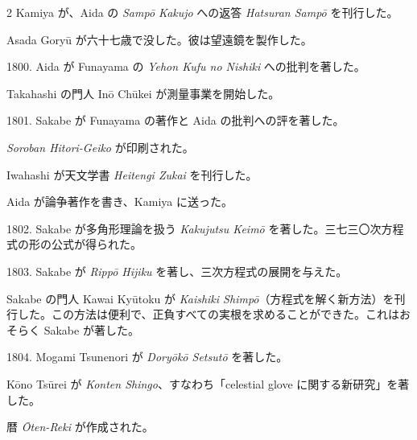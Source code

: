 \documentclass[11pt]{article}
\newcommand{\scanfooter}{}
\begin{document}
\begin{multicols}{2}
Kamiya が、Aida の \emph{Sampō Kakujo} への返答 \emph{Hatsuran Sampō} を刊行した。

Asada Goryū が六十七歳で没した。彼は望遠鏡を製作した。

1800. Aida が Funayama の \emph{Yehon Kufu no Nishiki} への批判を著した。

Takahashi の門人 Inō Chūkei が測量事業を開始した。

1801. Sakabe が Funayama の著作と Aida の批判への評を著した。

\emph{Soroban Hitori-Geiko} が印刷された。

Iwahashi が天文学書 \emph{Heitengi Zukai} を刊行した。

Aida が論争著作を書き、Kamiya に送った。

1802. Sakabe が多角形理論を扱う \emph{Kakujutsu Keimō} を著した。三七三〇次方程式の形の公式が得られた。

1803. Sakabe が \emph{Rippō Hijiku} を著し、三次方程式の展開を与えた。

Sakabe の門人 Kawai Kyūtoku が \emph{Kaishiki Shimpō}（方程式を解く新方法）を刊行した。この方法は便利で、正負すべての実根を求めることができた。これはおそらく Sakabe が著した。

1804. Mogami Tsunenori が \emph{Doryōkō Setsutō} を著した。

Kōno Tsūrei が \emph{Konten Shingo}、すなわち「celestial glove に関する新研究」を著した。

暦 \emph{Ōten-Reki} が作成された。
\end{multicols}
\scanfooter
\end{document}
